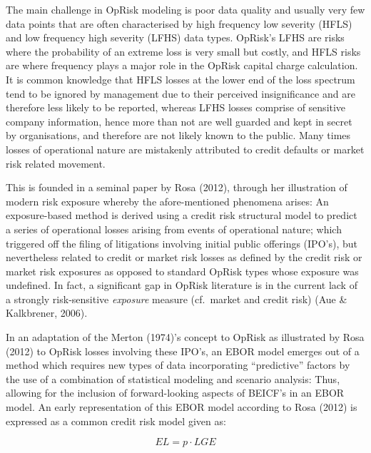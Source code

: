 \documentclass{DissertateUSU}
\begin{document}
The main challenge in OpRisk modeling is poor data quality and usually
very few data points that are often characterised by high frequency low
severity (HFLS) and low frequency high severity (LFHS) data types.
OpRisk's LFHS are risks where the probability of an extreme loss is very
small but costly, and HFLS risks are where frequency plays a major role
in the OpRisk capital charge calculation. It is common knowledge that
HFLS losses at the lower end of the loss spectrum tend to be ignored by
management due to their perceived insignificance and are therefore less
likely to be reported, whereas LFHS losses comprise of sensitive company
information, hence more than not are well guarded and kept in secret by
organisations, and therefore are not likely known to the public. Many
times losses of operational nature are mistakenly attributed to credit
defaults or market risk related movement.\medskip

This is founded in a seminal paper by Rosa (2012), through her
illustration of modern risk exposure whereby the afore-mentioned
phenomena arises: An exposure-based method is derived using a credit
risk structural model to predict a series of operational losses arising
from events of operational nature; which triggered off the filing of
litigations involving initial public offerings (IPO's), but nevertheless
related to credit or market risk losses as defined by the credit risk or
market risk exposures as opposed to standard OpRisk types whose exposure
was undefined. In fact, a significant gap in OpRisk literature is in the
current lack of a strongly risk-sensitive \emph{exposure} measure
(cf.~market and credit risk) (Aue \& Kalkbrener, 2006).\medskip

In an adaptation of the Merton (1974)'s concept to OpRisk as illustrated
by Rosa (2012) to OpRisk losses involving these IPO's, an EBOR model
emerges out of a method which requires new types of data incorporating
``predictive'' factors by the use of a combination of statistical
modeling and scenario analysis: Thus, allowing for the inclusion of
forward-looking aspects of BEICF's in an EBOR model. An early
representation of this EBOR model according to Rosa (2012) is expressed
as a common credit risk model given as:\medskip

\singlespacing

\begin{equation}\label{EBORmethod}
EL = p \cdot LGE 
\end{equation} \doublespacing
\end{document}
